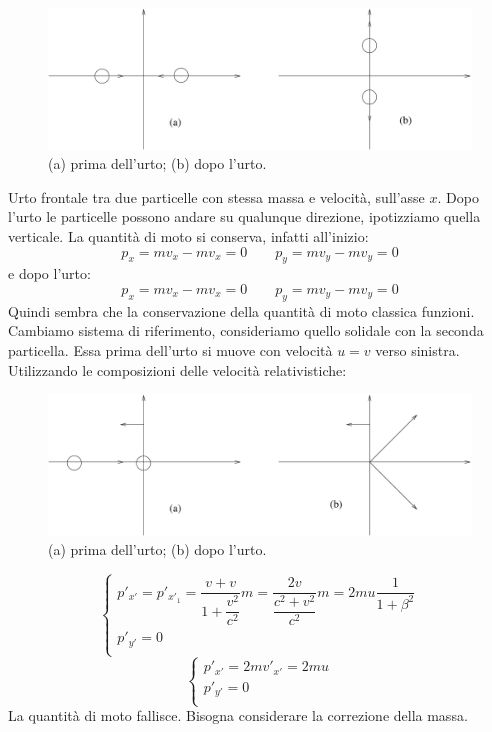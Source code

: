 \begin{Es}
\begin{figure}[htbp]
   \centering
   \includegraphics[scale=0.5]{immagini/fisica1/Q_rel1}
   \caption{(a) prima dell'urto; (b) dopo l'urto.}
\end{figure}
Urto frontale tra due particelle con stessa massa e velocità, sull'asse $x$. Dopo l'urto le particelle possono andare su qualunque direzione, ipotizziamo quella verticale. La quantità di moto si conserva, infatti all'inizio:
\[p_x=mv_x-mv_x=0\qquad p_y=mv_y-mv_y=0\]
e dopo l'urto:
\[p_x=mv_x-mv_x=0\qquad p_y=mv_y-mv_y=0\]
Quindi sembra che la conservazione della quantità di moto classica funzioni. Cambiamo sistema di riferimento, consideriamo quello solidale con la seconda particella. Essa prima dell'urto si muove con velocità $u=v$ verso sinistra. Utilizzando le composizioni delle velocità relativistiche:
\begin{figure}[htbp]
   \centering
   \includegraphics[scale=0.5]{immagini/fisica1/Q_rel2}
   \caption{(a) prima dell'urto; (b) dopo l'urto.}
\end{figure}

\[\left\{
\begin{array}{l}
p'_{x'}=p'_{x'_1}=\dfrac{v+v}{1+\dfrac{v^2}{c^2}}m=\dfrac{2v}{\dfrac{c^2+v^2}{c^2}}m=2mu\dfrac{1}{1+\beta^2}\\
p'_{y'}=0\\
\end{array}
\right. \]
\[\left\{
\begin{array}{l}
p'_{x'}=2mv'_{x'}=2mu\\
p'_{y'}=0\\
\end{array}
\right. \]
La quantità di moto fallisce. Bisogna considerare la correzione della massa.
\end{Es}
